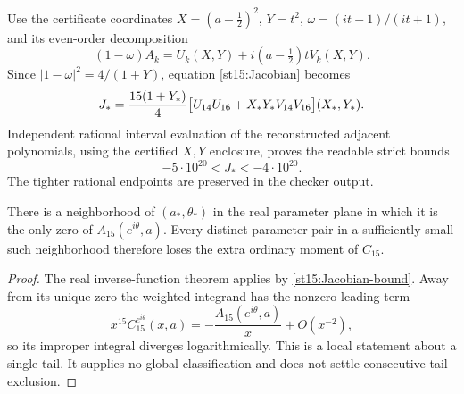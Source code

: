 Use the certificate coordinates $X=(a-\tfrac12)^2$, $Y=t^2$,
$\omega=(it-1)/(it+1)$, and its even-order decomposition
\[
 (1-\omega)A_k=U_k(X,Y)+i(a-\tfrac12)tV_k(X,Y).
\]
Since $|1-\omega|^2=4/(1+Y)$, equation \eqref{st15:Jacobian} becomes
\[
 J_*={15(1+Y_*)\over4}
   \bigl[U_{14}U_{16}+X_*Y_*V_{14}V_{16}\bigr](X_*,Y_*).
\]
Independent rational interval evaluation of the reconstructed adjacent
polynomials, using the certified $X,Y$ enclosure, proves the readable
strict bounds
\begin{equation}\label{st15:Jacobian-bound}
 -5\cdot10^{20}<J_*<-4\cdot10^{20}.
\end{equation}
The tighter rational endpoints are preserved in the checker output.

\begin{corollary}
There is a neighborhood of $(a_*,\theta_*)$ in the real parameter plane
in which it is the only zero of $A_{15}(e^{i\theta},a)$.
Every distinct parameter pair in a sufficiently small such neighborhood
therefore loses the extra ordinary moment of $C_{15}$.
\end{corollary}
\begin{proof}
The real inverse-function theorem applies by
\eqref{st15:Jacobian-bound}.  Away from its unique zero the weighted
integrand has the nonzero leading term
\[
 x^{15}C_{15}^{e^{i\theta}}(x,a)
       =-\frac{A_{15}(e^{i\theta},a)}x+O(x^{-2}),
\]
so its improper integral diverges logarithmically.  This is a local
statement about a single tail.  It supplies no global classification
and does not settle consecutive-tail exclusion.
\end{proof}
